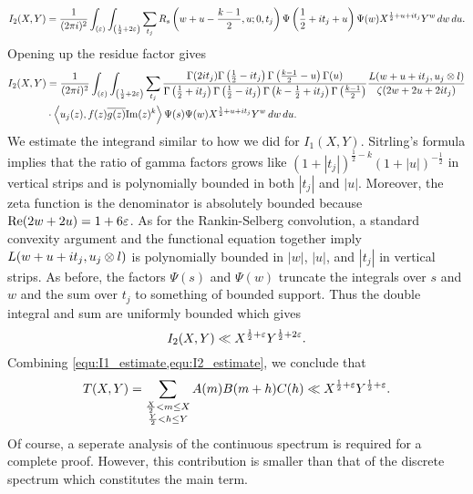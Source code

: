 \documentclass[12pt,reqno,oneside]{amsart}
\begin{document}
  \[
    I_{2}(X,Y) = \frac{1}{(2\pi i)^{2}}\int_{(\varepsilon)}\int_{\left(\frac{1}{2}+2\varepsilon\right)}\sum_{t_{j}}R_{s}\left(w+u-\frac{k-1}{2},u;0,t_{j}\right)\Psi\left(\frac{1}{2}+it_{j}+u\right)\Psi(w)X^{\frac{1}{2}+u+it_{j}}Y^{w}\,dw\,du.
  \]
  Opening up the residue factor gives
  \begin{align*}
    I_{2}(X,Y) &= \frac{1}{(2\pi i)^{2}}\int_{(\varepsilon)}\int_{\left(\frac{1}{2}+2\varepsilon\right)}\sum_{t_{j}}\frac{\Gamma(2it_{j})\Gamma\left(\frac{1}{2}-it_{j}\right)\Gamma\left(\frac{k-1}{2}-u\right)\Gamma(u)}{\Gamma\left(\frac{1}{2}+it_{j}\right)\Gamma\left(\frac{1}{2}-it_{j}\right)\Gamma\left(k-\frac{1}{2}+it_{j}\right)\Gamma\left(\frac{k-1}{2}\right)}\frac{L(w+u+it_{j},u_{j} \otimes l)}{\zeta(2w+2u+2it_{j})} \\
    &\cdot \left\langle u_{j}(z),f(z)\overline{g(z)}\mathrm{Im}(z)^{k}\right\rangle\Psi(s)\Psi(w)X^{\frac{1}{2}+u+it_{j}}Y^{w}\,dw\,du.
  \end{align*}
  We estimate the integrand similar to how we did for $I_{1}(X,Y)$. Sitrling's formula implies that the ratio of gamma factors grows like $(1+|t_{j}|)^{\frac{1}{2}-k}(1+|u|)^{-\frac{1}{2}}$ in vertical strips and is polynomially bounded in both $|t_{j}|$ and $|u|$. Moreover, the zeta function is the denominator is absolutely bounded because $\mathrm{Re}(2w+2u) = 1+6\varepsilon$. As for the Rankin-Selberg convolution, a standard convexity argument and the functional equation together imply $L(w+u+it_{j},u_{j} \otimes l)$ is polynomially bounded in $|w|$, $|u|$, and $|t_{j}|$ in vertical strips. As before, the factors $\Psi(s)$ and $\Psi(w)$ truncate the integrals over $s$ and $w$ and the sum over $t_{j}$ to something of bounded support. Thus the double integral and sum are uniformly bounded which gives
  \begin{equation}\label{equ:I2_estimate}
    I_{2}(X,Y) \ll X^{\frac{1}{2}+\varepsilon}Y^{\frac{1}{2}+2\varepsilon}.
  \end{equation}
  Combining \cref{equ:I1_estimate,equ:I2_estimate}, we conclude that
  \[
    T(X,Y) = \sum_{\substack{\frac{X}{2} < m \le X \\ \frac{Y}{2} < h \le Y}}A(m)B(m+h)C(h) \ll X^{\frac{1}{2}+\varepsilon}Y^{\frac{1}{2}+\varepsilon}.
  \]
  Of course, a seperate analysis of the continuous spectrum is required for a complete proof. However, this contribution is smaller than that of the discrete spectrum which constitutes the main term.

\appendix
\end{document}

